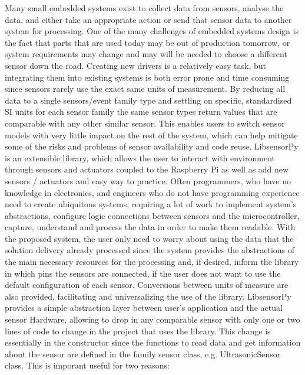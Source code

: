 \documentclass{acm_proc_article-sp}
\begin{document}
Many small embedded systems exist to collect data from sensors, analyse the data, and either take an appropriate action or send that sensor data to another system for processing. One of the many challenges of embedded systems design is the fact that parts that are used today may be out of production tomorrow, or system requirements may change and may will be needed to choose a different sensor down the road.
\newline
\newline
Creating new drivers is a relatively easy task, but integrating them into existing systems is both error prone and time consuming since sensors rarely use the exact same units of measurement. By reducing all data to a single sensors/event family type and settling on specific, standardised SI units for each sensor family the same sensor types return values that are comparable with any other similar sensor. This enables users to switch sensor models with very little impact on the rest of the system, which can help mitigate some of the risks and problems of sensor availability and code reuse.
\newline
\newline
LibsensorPy is an extensible library, which allows the user to interact with environment through sensors and actuators coupled to the Raspberry Pi as well as add new sensors / actuators and easy way to practice. Often programmers, who have no knowledge in electronics, and engineers who do not have programming experience need to create ubiquitous systems, requiring a lot of work to implement system's abstractions, configure logic connections between sensors and the microcontroller, capture, understand and process the data in order to make them readable.
\newline
\newline 
With the proposed system, the user only need to worry about using the data that the solution delivery already processed since the system provides the abstractions of the main necessary resources for the processing and, if desired, inform the library in which pins the sensors are connected, if the user does not want to use the default configuration of each sensor. Conversions between units of measure are also provided, facilitating and universalizing the use of the library.
\newline
\newline 
LibsensorPy provides a simple abstraction layer between user's application and the actual sensor Hardware, allowing to drop in any comparable sensor with only one or two lines of code to change in the project that uses the library. This change is essentially in the constructor since the functions to read data and get information about the sensor are defined in the family sensor class, e.g. UltrasonicSensor class.
\newline
\newline
This is imporant useful for two reasons:
\end{document}
